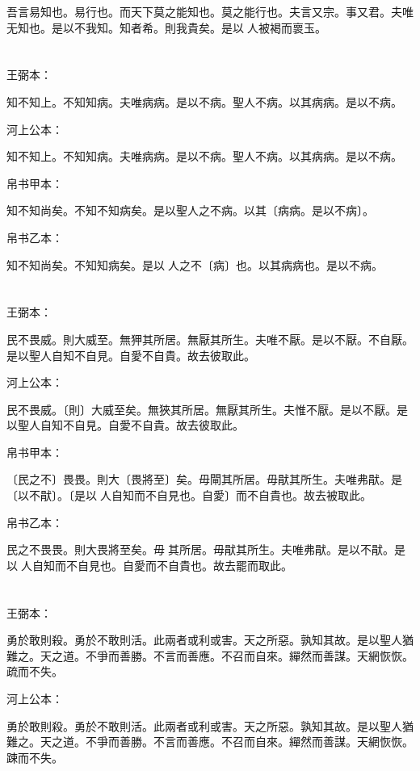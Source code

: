 \documentclass[a5paper]{ctexbook}
\begin{document}
    吾言易知也。易行也。而天下莫之能知也。莫之能行也。夫言又宗。事又君。夫唯无知也。是以不我知。知者希。則我貴矣。是以𦔻人被褐而褱玉。

    \chapter{}
    王弼本：

    知不知上。不知知病。夫唯病病。是以不病。聖人不病。以其病病。是以不病。

    河上公本：

    知不知上。不知知病。夫唯病病。是以不病。聖人不病。以其病病。是以不病。

    帛书甲本：

    知不知尚矣。不知不知病矣。是以聖人之不病。以其〔病病。是以不病〕。

    帛书乙本：

    知不知尚矣。不知知病矣。是以𦔻人之不〔病〕也。以其病病也。是以不病。

    \chapter{}
    王弼本：

    民不畏威。則大威至。無狎其所居。無厭其所生。夫唯不厭。是以不厭。不自厭。是以聖人自知不自見。自愛不自貴。故去彼取此。

    河上公本：

    民不畏威。〔則〕大威至矣。無狹其所居。無厭其所生。夫惟不厭。是以不厭。是以聖人自知不自見。自愛不自貴。故去彼取此。

    帛书甲本：

    〔民之不〕畏畏。則大〔畏將至〕矣。毋閘其所居。毋猒其所生。夫唯弗猒。是〔以不猒〕。〔是以𦔻人自知而不自見也。自愛〕而不自貴也。故去被取此。

    帛书乙本：

    民之不畏畏。則大畏將至矣。毋𠇺其所居。毋猒其所生。夫唯弗猒。是以不猒。是以𦔻人自知而不自見也。自愛而不自貴也。故去罷而取此。

    \chapter{}
    王弼本：

    勇於敢則殺。勇於不敢則活。此兩者或利或害。天之所惡。孰知其故。是以聖人猶難之。天之道。不爭而善勝。不言而善應。不召而自來。繟然而善謀。天網恢恢。疏而不失。

    河上公本：

    勇於敢則殺。勇於不敢則活。此兩者或利或害。天之所惡。孰知其故。是以聖人猶難之。天之道。不爭而善勝。不言而善應。不召而自來。繟然而善謀。天網恢恢。踈而不失。
\end{document}
